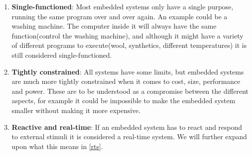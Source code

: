 \begin{enumerate}
  \item \textbf{Single-functioned}: Most embedded systems only have a single
  purpose, running the same program over and over again. An example could be a
  washing machine. The computer inside it will always have the same
  function(control the washing machine), and although it might have a variety of
  different programs to execute(wool, synthetics, different temperatures) it is
  still considered single-functioned.
  \item \textbf{Tightly constrained}: All systems have some limits, but embedded
  systems are much more tightly constrained when it comes to cost, size,
  performance and power. These are to be understood as a compromise between the
  different aspects, for example it could be impossible to make the embedded
  system smaller without making it more expensive.
  \item \textbf{Reactive and real-time}: If an embedded system has to react and
  respond to external stimuli it is considered a real-time system. We will
  further expand upon what this means in \autoref{rts}.
\end{enumerate}
